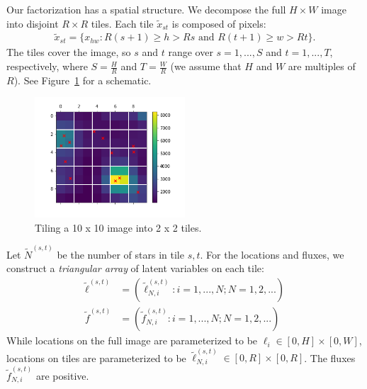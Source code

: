Our factorization has a spatial structure. We decompose the full $H \times W$ image into disjoint $R \times R$ tiles. Each tile $\tilde x_{st}$ is composed of pixels:
\begin{align}
    \tilde x_{st} = \{x_{hw} : R(s+1) \geq h > Rs \text{ and } R(t+1) \geq w > Rt\}.
    \label{eq:tiles}
\end{align}
The tiles cover the image, so $s$ and $t$ range over $s = 1, ..., S$ and $t = 1, ..., T$, respectively, where $S = \frac{H}{R}$ and $T = \frac{W}{R}$ (we assume that $H$ and $W$ are multiples of $R$). See Figure~\ref{fig:ex_tiles} for a schematic.
\begin{figure}[!ht]
    \centering
    \includegraphics[width = 0.5\textwidth]{figures/example_tiled.png}
    \vspace{-1cm}
    \caption{Tiling a 10 x 10 image into 2 x 2 tiles.}
    \label{fig:ex_tiles}
\end{figure}

Let $\tilde N^{(s, t)}$ be the number of stars in tile $s, t$. 
For the locations and fluxes, we construct a {\itshape triangular array}  of latent variables on each tile:
\begin{align}
    \tilde\ell^{(s, t)} &= (\tilde\ell_{N, i}^{(s, t)} : i = 1, ..., N; N = 1, 2, ...) \\
    \tilde f^{(s, t)} &= (\tilde f_{N, i}^{(s, t)} : i = 1, ..., N; N = 1, 2, ...)
\end{align}
While locations on the full image are parameterized to be
$\ell_i \in [0, H]\times[0, W]$, locations on tiles are parameterized to be $\tilde\ell_{N, i}^{(s, t)} \in [0, R]\times[0, R]$. The fluxes $\tilde f_{N, i}^{(s, t)}$ are positive. 

